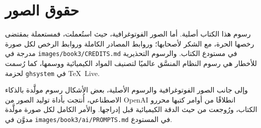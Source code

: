 \chapter*{حقوق الصور}

رسوم هذا الكتاب أصلية. أما الصور الفوتوغرافية، حيث استُعملت، فمستعملة
بمقتضى رخصها الحرة، مع الشكر لأصحابها؛ وروابط المصادر الكاملة وروابط
الرخص لكل صورة مدرجة في
\texttt{images/book3/CREDITS.md} في مستودع الكتاب.
والرسوم التحذيرية للأخطار هي رسوم النظام المنسَّق عالميًا لتصنيف
المواد الكيميائية ووسمها، كما رُسمت لحزمة
\texttt{ghsystem} في \TeX\ Live.

\bigskip
وإلى جانب الصور الفوتوغرافية والرسوم الأصلية، بعض الأشكال
رسوم مولَّدة بالذكاء الاصطناعي، أُنتجت بأداة توليد الصور من OpenAI انطلاقًا من
أوامر كتبها محررو الكتاب، ورُوجعت من حيث الدقة الكيميائية قبل
إدراجها. والأمر الكامل لكل صورة مولَّدة
مدوَّن في \texttt{images/book3/ai/PROMPTS.md} في المستودع.

